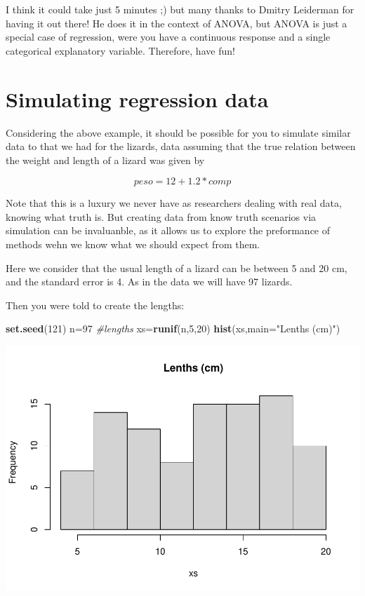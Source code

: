 \documentclass[
]{book}
\newenvironment{Shaded}{\begin{snugshade}}{\end{snugshade}}
\newcommand{\AttributeTok}[1]{\textcolor[rgb]{0.13,0.29,0.53}{#1}}
\newcommand{\CommentTok}[1]{\textcolor[rgb]{0.56,0.35,0.01}{\textit{#1}}}
\newcommand{\DecValTok}[1]{\textcolor[rgb]{0.00,0.00,0.81}{#1}}
\newcommand{\FunctionTok}[1]{\textcolor[rgb]{0.13,0.29,0.53}{\textbf{#1}}}
\newcommand{\NormalTok}[1]{#1}
\newcommand{\OtherTok}[1]{\textcolor[rgb]{0.56,0.35,0.01}{#1}}
\newcommand{\StringTok}[1]{\textcolor[rgb]{0.31,0.60,0.02}{#1}}
\begin{document}
I think it could take just 5 minutes ;) but many thanks to Dmitry Leiderman for having it out there! He does it in the context of ANOVA, but ANOVA is just a special case of regression, were you have a continuous response and a single categorical explanatory variable. Therefore, have fun!

\section{Simulating regression data}\label{simulating-regression-data}

Considering the above example, it should be possible for you to simulate similar data to that we had for the lizards, data assuming that the true relation between the weight and length of a lizard was given by

\[ peso = 12 + 1.2 * comp \]

Note that this is a luxury we never have as researchers dealing with real data, knowing what truth is. But creating data from know truth scenarios via simulation can be invaluanble, as it allows us to explore the preformance of methods wehn we know what we should expect from them.

Here we consider that the usual length of a lizard can be between 5 and 20 cm, and the standard error is 4. As in the data we will have 97 lizards.

Then you were told to create the lengths:

\begin{Shaded}
\begin{Highlighting}[]
\FunctionTok{set.seed}\NormalTok{(}\DecValTok{121}\NormalTok{)}
\NormalTok{n}\OtherTok{=}\DecValTok{97}
\CommentTok{\#lengths}
\NormalTok{xs}\OtherTok{=}\FunctionTok{runif}\NormalTok{(n,}\DecValTok{5}\NormalTok{,}\DecValTok{20}\NormalTok{)}
\FunctionTok{hist}\NormalTok{(xs,}\AttributeTok{main=}\StringTok{"Lenths (cm)"}\NormalTok{)}
\end{Highlighting}
\end{Shaded}

\includegraphics{ECOMODbook_files/figure-latex/a6.21-1.pdf}
\end{document}
